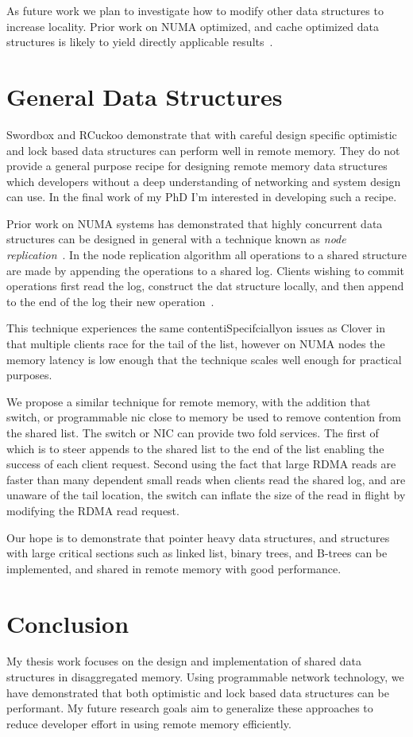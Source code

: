 As future work we plan to investigate how to modify other
data structures to increase locality.  Prior work on NUMA
optimized, and cache optimized data structures is likely to
yield directly applicable results~\cite{hopscotch}.

\section{General Data Structures}

Swordbox and RCuckoo demonstrate that with careful design
specific optimistic and lock based data structures can
perform well in remote memory. They do not provide a general
purpose recipe for designing remote memory data structures
which developers without a deep understanding of networking
and system design can use. In the final work of my PhD I'm
interested in developing such a recipe.

Prior work on NUMA systems has demonstrated that highly
concurrent data structures can be designed in general with a
technique known as \textit{node
replication}~\cite{black-box-numa}. In the node replication
algorithm all operations to a shared structure are made by
appending the operations to a shared log. Clients wishing to
commit operations first read the log, construct the dat
structure locally, and then append to the end of the log
their new operation~\cite{black-box-numa}.

This technique experiences the same contentiSpecifciallyon issues as
Clover in that multiple clients race for the tail of the
list, however on NUMA nodes the memory latency is low enough
that the technique scales well enough for practical
purposes. 

We propose a similar technique for remote memory, with the
addition that switch, or programmable nic close to memory be
used to remove contention from the shared list. The switch
or NIC can provide two fold services. The first of which is
to steer appends to the shared list to the end of the list
enabling the success of each client request. Second using
the fact that large RDMA reads are faster than many
dependent small reads  when clients read the shared log, and
are unaware of the tail location, the switch can inflate the
size of the read in flight by modifying the RDMA read
request. 

Our hope is to demonstrate that pointer heavy data
structures, and structures with large critical sections such
as linked list, binary trees, and B-trees can be
implemented, and shared in remote memory with good
performance.

\section{Conclusion}

My thesis work focuses on the design and implementation of
shared data structures in disaggregated memory. Using
programmable network technology, we have demonstrated that
both optimistic and lock based data structures can be
performant. My future research goals aim to generalize these
approaches to reduce developer effort in using remote memory
efficiently.
